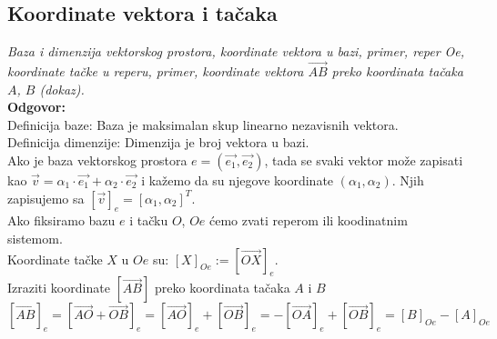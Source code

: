 \documentclass[12pt]{article}
\begin{document}
\par

\subsection{Koordinate vektora i tačaka}
\textit{Baza i dimenzija vektorskog prostora, koordinate vektora
    u bazi, primer, reper Oe, koordinate tačke u reperu,
    primer, koordinate vektora
    $\overrightarrow{AB}$ preko koordinata tačaka $A$, $B$ (dokaz).
}\\
\textbf{Odgovor:}\\
Definicija baze: Baza je maksimalan skup linearno nezavisnih vektora.\\
Definicija dimenzije: Dimenzija je broj vektora u bazi.\\
Ako je baza vektorskog prostora $e=(\overrightarrow{e_1}, \overrightarrow{e_2})$,
tada se svaki vektor može zapisati kao $\overrightarrow{v}=\alpha_1\cdot\overrightarrow{e_1}+\alpha_2\cdot\overrightarrow{e_2}$
i kažemo da su njegove koordinate $(\alpha_1, \alpha_2)$. Njih zapisujemo
sa $[\overrightarrow{v}]_e=[\alpha_1, \alpha_2]^T$.\\
Ako fiksiramo bazu $e$ i tačku $O$, $Oe$ ćemo zvati reperom ili
koodinatnim sistemom.\\
Koordinate tačke $X$ u $Oe$ su: $[X]_{Oe}:=[\overrightarrow{OX}]_e$.\\
Izraziti koordinate $[\overrightarrow{AB}]$ preko koordinata tačaka $A$ i $B$
$$[\overrightarrow{AB}]_e=[\overrightarrow{AO}+\overrightarrow{OB}]_e=[\overrightarrow{AO}]_e+[\overrightarrow{OB}]_e=-[\overrightarrow{OA}]_e+[\overrightarrow{OB}]_e=[B]_{Oe}-[A]_{Oe}$$

\par
\end{document}
